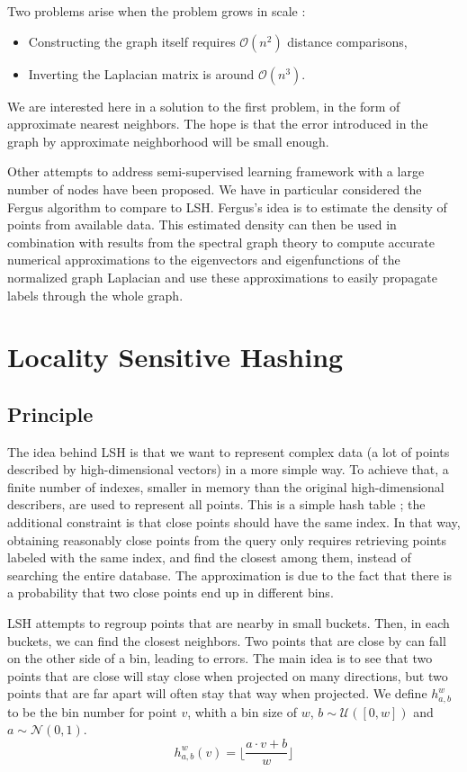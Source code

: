 \documentclass{article} %
\begin{document}
Two problems arise when the problem grows in scale :
\begin{itemize}
\item Constructing the graph itself requires $\mathcal{O}(n^2)$ distance comparisons,
\item Inverting the Laplacian matrix is around $\mathcal{O}(n^3)$.
\end{itemize}

We are interested here in a solution to the first problem, in the form of approximate nearest neighbors. The hope is that the error introduced in the graph by approximate neighborhood will be small enough.

Other attempts to address semi-supervised learning framework with a large number of nodes have been proposed. We have in particular considered the Fergus algorithm \cite{fergus2009semi} to compare to LSH. Fergus's idea is to estimate the density of points from available data. This estimated density can then be used in combination with results from the spectral graph theory to compute accurate numerical approximations to the eigenvectors and eigenfunctions of the normalized graph Laplacian and use these approximations to easily propagate labels through the whole graph.


\section{Locality Sensitive Hashing}
\subsection{Principle}

The idea behind LSH is that we want to represent complex data (a lot of points described by high-dimensional vectors) in a more simple way. To achieve that, a finite number of indexes, smaller in memory than the original high-dimensional describers, are used to represent all points. This is a simple hash table ; the additional constraint is that close points should have the same index. In that way, obtaining reasonably close points from the query only requires retrieving points labeled with the same index, and find the closest among them, instead of searching the entire database. The approximation is due to the fact that there is a probability that two close points end up in different bins.

LSH attempts to regroup points that are nearby in small buckets. Then, in each buckets, we can find the closest neighbors. Two points that are close by can fall on the other side of a bin, leading to errors. The main idea is to see that two points that are close will stay close when projected on many directions, but two points that are far apart will often stay that way when projected. We define $h^w_{a,b}$ to be the bin number for point $v$, whith a bin size of $w$, $b \sim \mathcal{U}([0,w])$ and $a \sim \mathcal{N}(0,1)$.
$$h_{a,b}^w(v) = \lfloor \frac{ a \cdot v + b}{w} \rfloor$$
\end{document}
